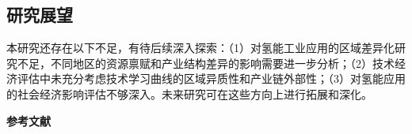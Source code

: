 \documentclass[12pt,a4paper]{ctexart}
\begin{document}
\subsection{研究展望}

本研究还存在以下不足，有待后续深入探索：（1）对氢能工业应用的区域差异化研究不足，不同地区的资源禀赋和产业结构差异的影响需要进一步分析；（2）技术经济评估中未充分考虑技术学习曲线的区域异质性和产业链外部性；（3）对氢能应用的社会经济影响评估不够深入。未来研究可在这些方向上进行拓展和深化。

\vspace{6bp}

\renewcommand{\refname}{}
\begin{center}
    {\bfseries 参考文献}
\end{center}
\vspace{12bp}
\end{document}
